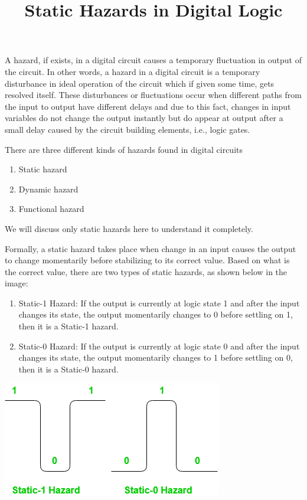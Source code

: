 \documentclass[12pt]{article}
\begin{document}
\title{Static Hazards in Digital Logic}
\maketitle

A hazard, if exists, in a digital circuit causes a temporary fluctuation in output of the circuit. In other words, a hazard in a digital circuit is a temporary disturbance in ideal operation of the circuit which if given some time, gets resolved itself. These disturbances or fluctuations occur when different paths from the input to output have different delays and due to this fact, changes in input variables do not change the output instantly but do appear at output after a small delay caused by the circuit building elements, i.e., logic gates.

There are three different kinds of hazards found in digital circuits

\begin{enumerate}
	\item Static hazard
	\item Dynamic hazard
	\item Functional hazard
\end{enumerate}


We will discuss only static hazards here to understand it completely.


Formally, a static hazard takes place when change in an input causes the output to change momentarily before stabilizing to its correct value. Based on what is the correct value, there are two types of static hazards, as shown below in the image:


\begin{enumerate}
	\item Static-1 Hazard: If the output is currently at logic state 1 and after the input changes its state, the output momentarily changes to 0 before settling on 1, then it is a Static-1 hazard.
	\item Static-0 Hazard: If the output is currently at logic state 0 and after the input changes its state, the output momentarily changes to 1 before settling on 0, then it is a Static-0 hazard.
\end{enumerate}


\begin{center}
	\includegraphics[scale=0.8]{./2222.png}
\end{center}
\end{document}
